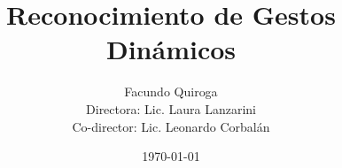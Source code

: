 
\title{
{\LARGE Reconocimiento de Gestos Dinámicos}
}  
\author{
{\large Facundo Quiroga }\\
\vspace{12px} 
{\small Directora: Lic. Laura Lanzarini \\
\vspace{1px} 
Co-director: Lic. Leonardo Corbalán }
}
\date{
{\small 
\today }
} 

